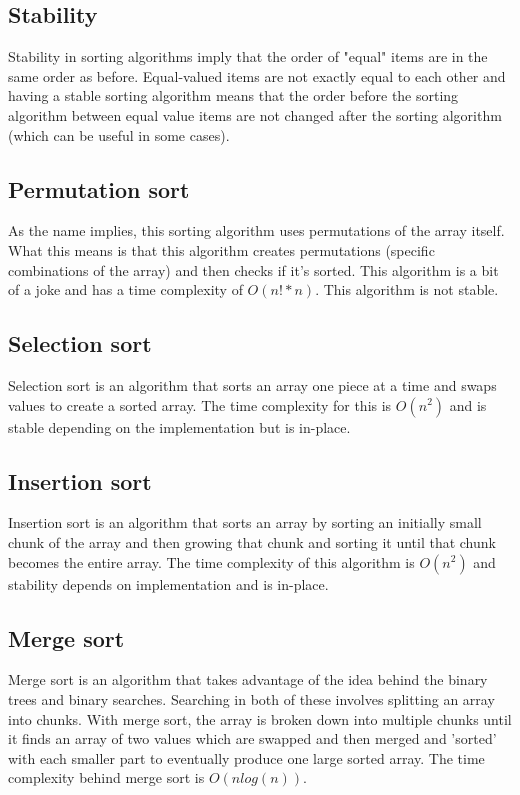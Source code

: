 \documentclass[11pt,a4paper,english]{report}
\begin{document}
\subsection{Stability}

Stability in sorting algorithms imply that the order of "equal" items are in the same order as before. Equal-valued items are not exactly equal to each other and having a stable sorting algorithm means that the order before the sorting algorithm between equal value items are not changed after the sorting algorithm (which can be useful in some cases).

\subsection{Permutation sort}

As the name implies, this sorting algorithm uses permutations of the array itself. What this means is that this algorithm creates permutations (specific combinations of the array) and then checks if it's sorted. This algorithm is a bit of a joke and has a time complexity of $O(n! * n)$. This algorithm is not stable.

\subsection{Selection sort}

Selection sort is an algorithm that sorts an array one piece at a time and swaps values to create a sorted array. The time complexity for this is $O(n^2)$ and is stable depending on the implementation but is in-place.

\subsection{Insertion sort}

Insertion sort is an algorithm that sorts an array by sorting an initially small chunk of the array and then growing that chunk and sorting it until that chunk becomes the entire array. The time complexity of this algorithm is $O(n^2)$ and stability depends on implementation and is in-place.

\subsection{Merge sort}

Merge sort is an algorithm that takes advantage of the idea behind the binary trees and binary searches. Searching in both of these involves splitting an array into chunks. With merge sort, the array is broken down into multiple chunks until it finds an array of two values which are swapped and then merged and 'sorted' with each smaller part to eventually produce one large sorted array. The time complexity behind merge sort is $O(n log(n))$.
\end{document}
